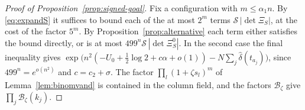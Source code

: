 \begin{proof}[Proof of Proposition~\ref{prop:signed-goal}]
Fix a configuration with $m\le\alpha_1n$. By \eqref{eq:expandS} it suffices to bound each of the at most $2^m$ terms
$\mathcal S\,|\det\Xi_S|$, at the cost of the factor $5^m$. By Proposition~\ref{prop:alternative} each term either satisfies the
bound directly, or is at most $499^n\mathcal S\,|\det\Xi^0_S|$. In the second case the final inequality gives
$\exp\bigl(n^2(-U_0+\frac12\log2+c\alpha+o(1))-N\sum_j\hat\delta(t_{a_j})\bigr)$, since $499^n=e^{o(n^2)}$ and $c=c_2+\sigma$.
The factor $\prod_l(1+\zeta s_l)^m$ of Lemma~\ref{lem:binomvand} is contained in the column field, and the factors $\mathcal B_\zeta$ give
$\prod_j\mathcal B_\zeta(k_j)$.
\end{proof}
